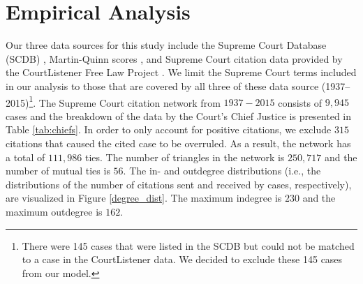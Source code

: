\documentclass[headsepline=true, abstracton]{scrartcl}
\begin{document}
 \section{Empirical Analysis}
Our three data sources for this study include the Supreme Court Database (SCDB) \citep{spaeth2014supreme}, Martin-Quinn scores \citep{martin2002dynamic}, and Supreme Court citation data provided by the CourtListener Free Law Project \citep{CourtListener}. We limit the Supreme Court terms included in our analysis to those that are covered by all three of these data source (1937--2015)\footnote{There were 145 cases that were listed in the SCDB but could not be matched to a case in the CourtListener data. We decided to exclude these 145 cases from our model.}. The Supreme Court citation network from $1937 - 2015$ consists of $9,945$ cases and the breakdown of the data by the Court's Chief Justice is presented in Table \ref{tab:chiefs}. In order to only account for positive citations, we exclude $315$ citations that caused the cited case to be overruled. As a result, the network has a total of $111,986$ ties. The number of triangles in the network is $250,717$ and the number of mutual ties is $56$. The in- and outdegree distributions (i.e., the distributions of the number of citations sent and received by cases, respectively), are visualized in Figure \ref{degree_dist}. The maximum indegree is $230$ and the maximum outdegree is $162$.
\end{document}
